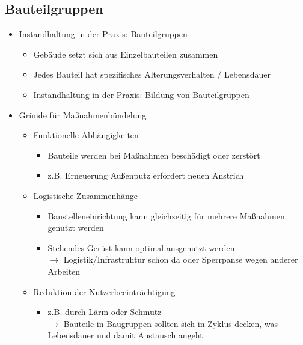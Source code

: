\documentclass[fleqn,twoside,dvipsnames]{article}
\begin{document}
    
    
    \subsection{Bauteilgruppen}
        \begin{itemize}
            \item Instandhaltung in der Praxis: Bauteilgruppen
                \begin{itemize}
                    \item Gebäude setzt sich aus Einzelbauteilen zusammen
                    \item Jedes Bauteil hat spezifisches Alterungsverhalten / Lebensdauer
                    \item Instandhaltung in der Praxis: Bildung von Bauteilgruppen
                \end{itemize}
            \item Gründe für Maßnahmenbündelung
                \begin{itemize}
                    \item Funktionelle Abhängigkeiten
                        \begin{itemize}
                            \item Bauteile werden bei Maßnahmen beschädigt oder zerstört
                            \item z.B. Erneuerung Außenputz erfordert neuen Anstrich
                        \end{itemize}
                    \item Logistische Zusammenhänge
                        \begin{itemize}
                            \item Baustelleneinrichtung kann gleichzeitig für mehrere Maßnahmen genutzt werden
                            \item Stehendes Gerüst kann optimal ausgenutzt werden\\
                               $\rightarrow$ Logistik/Infrastruhtur schon da oder Sperrpanse wegen anderer Arbeiten
                        \end{itemize}
                    \item Reduktion der Nutzerbeeinträchtigung
                        \begin{itemize}
                            \item z.B. durch Lärm oder Schmutz\\
                                $\rightarrow$ Bauteile in Baugruppen sollten sich in Zyklus decken, was Lebensdauer und damit Austausch angeht
                        \end{itemize}
                \end{itemize}


\end{itemize}
\end{document}
